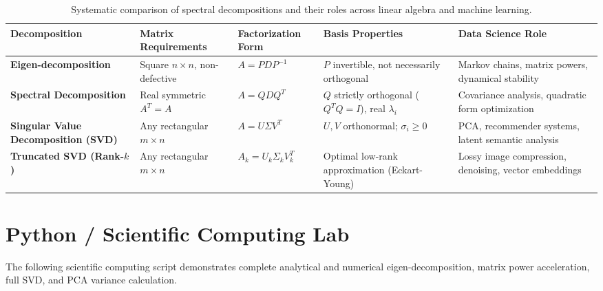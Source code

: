 \begin{table}[htbp]
\centering
\small
\begin{tabular}{p{2.8cm} p{2.8cm} p{2.8cm} p{2.6cm} p{2.8cm}}
\toprule
\textbf{Decomposition} & \textbf{Matrix Requirements} & \textbf{Factorization Form} & \textbf{Basis Properties} & \textbf{Data Science Role} \\
\midrule
\textbf{Eigen-decomposition} & Square $n \times n$, non-defective & $A = P D P^{-1}$ & $P$ invertible, not necessarily orthogonal & Markov chains, matrix powers, dynamical stability \\
\textbf{Spectral Decomposition} & Real symmetric $A^T = A$ & $A = Q D Q^T$ & $Q$ strictly orthogonal ($Q^T Q = I$), real $\lambda_i$ & Covariance analysis, quadratic form optimization \\
\textbf{Singular Value Decomposition (SVD)} & Any rectangular $m \times n$ & $A = U \Sigma V^T$ & $U, V$ orthonormal; $\sigma_i \ge 0$ & PCA, recommender systems, latent semantic analysis \\
\textbf{Truncated SVD (Rank-$k$)} & Any rectangular $m \times n$ & $A_k = U_k \Sigma_k V_k^T$ & Optimal low-rank approximation (Eckart-Young) & Lossy image compression, denoising, vector embeddings \\
\bottomrule
\end{tabular}
\caption{Systematic comparison of spectral decompositions and their roles across linear algebra and machine learning.}
\label{tab:spectral_decompositions_taxonomy}
\end{table}

\section{Python / Scientific Computing Lab}

The following scientific computing script demonstrates complete analytical and numerical eigen-decomposition, matrix power acceleration, full SVD, and PCA variance calculation.

